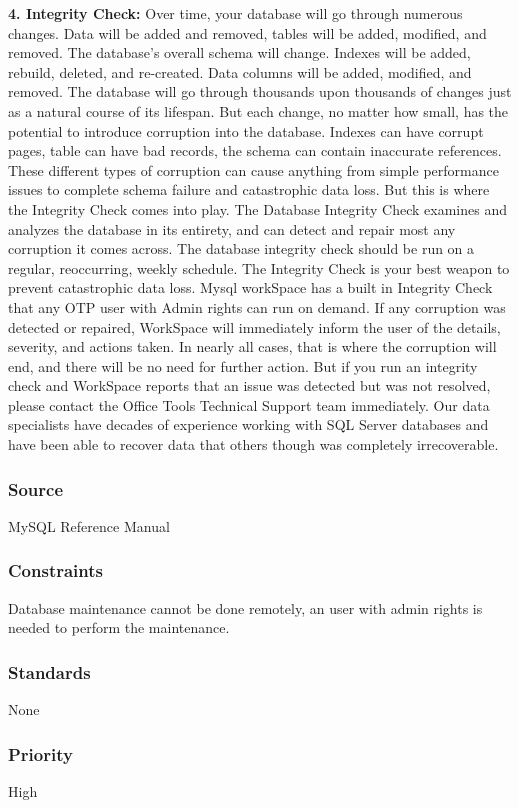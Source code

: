 \textbf{4. Integrity Check:}
Over time, your database will go through numerous changes. Data will be added and removed, tables will be added, modified, and removed. The database’s overall schema will change. Indexes will be added, rebuild, deleted, and re-created. Data columns will be added, modified, and removed. The database will go through thousands upon thousands of changes just as a natural course of its lifespan. But each change, no matter how small, has the potential to introduce corruption into the database. Indexes can have corrupt pages, table can have bad records, the schema can contain inaccurate references. These different types of corruption can cause anything from simple performance issues to complete schema failure and catastrophic data loss. But this is where the Integrity Check comes into play. The Database Integrity Check examines and analyzes the database in its entirety, and can detect and repair most any corruption it comes across. The database integrity check should be run on a regular, reoccurring, weekly schedule. The Integrity Check is your best weapon to prevent catastrophic data loss. Mysql workSpace has a built in Integrity Check that any OTP user with Admin rights can run on demand. If any corruption was detected or repaired, WorkSpace will immediately inform the user of the details, severity, and actions taken. In nearly all cases, that is where the corruption will end, and there will be no need for further action. But if you run an integrity check and WorkSpace reports that an issue was detected but was not resolved, please contact the Office Tools Technical Support team immediately. Our data specialists have decades of experience working with SQL Server databases and have been able to recover data that others though was completely irrecoverable.
\subsubsection{Source}
MySQL Reference Manual
\subsubsection{Constraints}
Database maintenance cannot be done remotely, an user with admin rights is needed to perform the maintenance.
\subsubsection{Standards}
None
\subsubsection{Priority}
High